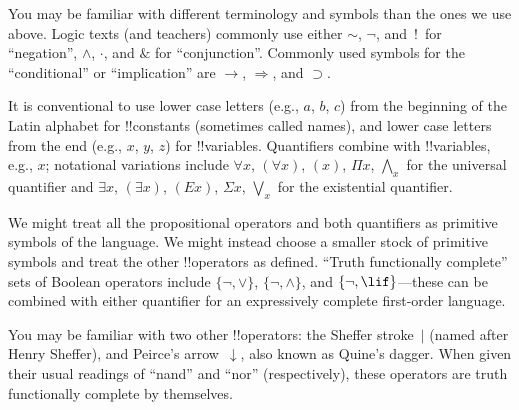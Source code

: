 \documentclass[../../../include/open-logic-section]{subfiles}
\begin{document}

\begin{intro}
You may be familiar with different terminology and symbols than the
ones we use above. Logic texts (and teachers) commonly use either
$\sim$, $\neg$, and~!\ for ``negation'', $\wedge$, $\cdot$, and $\&$
for ``conjunction''.  Commonly used symbols for the ``conditional'' or
``implication'' are $\rightarrow$, $\Rightarrow$, and $\supset$.

It is conventional to use lower case letters (e.g., $a$, $b$, $c$) from
the beginning of the Latin alphabet for !!{constant}s (sometimes called
names), and lower case letters from the end (e.g., $x$, $y$, $z$) for
!!{variable}s. Quantifiers combine with !!{variable}s, e.g., $x$;
notational variations include $\forall x$, $(\forall x)$, $(x)$, $\Pi x$,
$\bigwedge_x$ for the universal quantifier and $\exists x$, $(\exists
x)$, $(Ex)$, $\Sigma x$, $\bigvee_x$ for the existential quantifier.
\end{intro}

\begin{explain}
We might treat all the propositional operators and both quantifiers as
primitive symbols of the language.  We might instead choose a smaller
stock of primitive symbols and treat the other !!{operator}s as
defined. ``Truth functionally complete'' sets of Boolean operators
include $\{ \lnot, \lor \}$, $\{ \lnot, \land \}$, and $\{ \lnot,
\lif\}$---these can be combined with either quantifier for an
expressively complete first-order language.

You may be familiar with two other !!{operator}s: the Sheffer
stroke~$|$ (named after Henry Sheffer), and Peirce's
arrow~$\downarrow$, also known as Quine's dagger.  When given their
usual readings of ``nand'' and ``nor'' (respectively), these operators
are truth functionally complete by themselves.
\end{explain}
\end{document}
